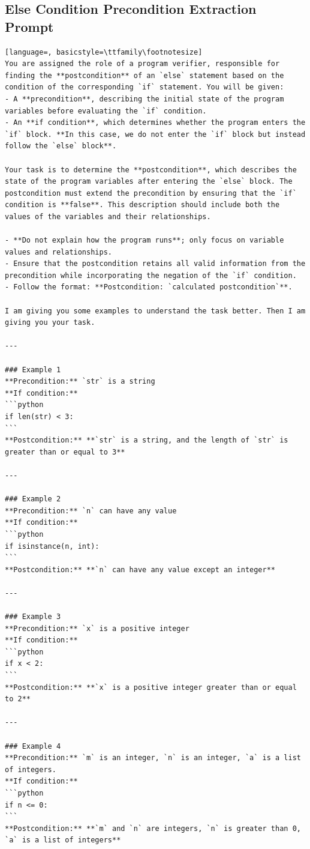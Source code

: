 \documentclass[sigconf]{acmart}
\begin{document}
\subsection{Else Condition Precondition Extraction Prompt}
\label{else_pre_prompt}
\begin{tcolorbox}[ colback=gray!10, colframe=black, arc=5pt]
\begin{lstlisting}[language=, basicstyle=\ttfamily\footnotesize]
You are assigned the role of a program verifier, responsible for finding the **postcondition** of an `else` statement based on the condition of the corresponding `if` statement. You will be given:
- A **precondition**, describing the initial state of the program variables before evaluating the `if` condition.
- An **if condition**, which determines whether the program enters the `if` block. **In this case, we do not enter the `if` block but instead follow the `else` block**.

Your task is to determine the **postcondition**, which describes the state of the program variables after entering the `else` block. The postcondition must extend the precondition by ensuring that the `if` condition is **false**. This description should include both the values of the variables and their relationships.

- **Do not explain how the program runs**; only focus on variable values and relationships.
- Ensure that the postcondition retains all valid information from the precondition while incorporating the negation of the `if` condition.
- Follow the format: **Postcondition: `calculated postcondition`**.

I am giving you some examples to understand the task better. Then I am giving you your task.

---

### Example 1  
**Precondition:** `str` is a string  
**If condition:**  
```python
if len(str) < 3:
```
**Postcondition:** **`str` is a string, and the length of `str` is greater than or equal to 3**

---

### Example 2  
**Precondition:** `n` can have any value  
**If condition:**  
```python
if isinstance(n, int):
```
**Postcondition:** **`n` can have any value except an integer**

---

### Example 3  
**Precondition:** `x` is a positive integer  
**If condition:**  
```python
if x < 2:
```
**Postcondition:** **`x` is a positive integer greater than or equal to 2**

---

### Example 4  
**Precondition:** `m` is an integer, `n` is an integer, `a` is a list of integers.  
**If condition:**  
```python
if n <= 0:
```
**Postcondition:** **`m` and `n` are integers, `n` is greater than 0, `a` is a list of integers**

\end{lstlisting}
\end{tcolorbox}
\end{document}
